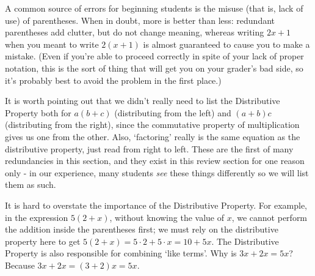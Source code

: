 \medskip


\medskip

 A common source of errors for beginning students is the misuse (that is, lack of use) of parentheses. When in doubt, more is better than less: redundant parentheses add clutter, but do not change meaning, whereas writing $2x+1$ when you meant to write $2(x+1)$ is almost guaranteed to cause you to make a mistake. (Even if you're able to proceed correctly in spite of your lack of proper notation, this is the sort of thing that will get you on your grader's bad side, so it's probably best to avoid the problem in the first place.)

\medskip


It is worth pointing out that we didn't really need to list the Distributive Property both for $a(b+c)$ (distributing from the left) and $(a+b)c$ (distributing from the right), since the commutative property of multiplication gives us one from the other.  Also, `factoring' really is the same equation as the distributive property, just read from right to left. These are the first of many redundancies in this section, and they exist in this review section for one reason only - in our experience, many students \textit{see} these things differently so we will list them as such.   

\smallskip

It is hard to overstate the importance of the Distributive Property.  For example, in the expression $5(2+x)$, without knowing the value of $x$, we cannot perform the addition inside the parentheses first;  we must rely on the distributive property here to get  $5(2+x) = 5\cdot 2 + 5 \cdot x = 10 + 5x$.  The Distributive Property is also responsible for combining `like terms'.  Why is $3x + 2x = 5x$?  Because  $3x + 2x = (3+2)x = 5x$.  

\smallskip

